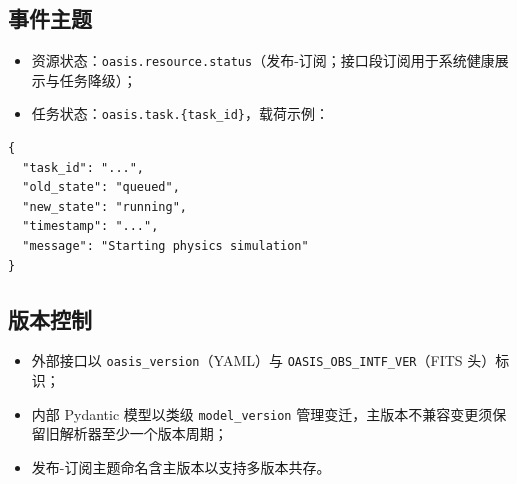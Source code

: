 \subsection{事件主题}

\begin{itemize}
  \item 资源状态：\texttt{oasis.resource.status}（发布-订阅；接口段订阅用于系统健康展示与任务降级）；
  \item 任务状态：\texttt{oasis.task.\{task\_id\}}，载荷示例：
\end{itemize}

\begin{verbatim}
{
  "task_id": "...",
  "old_state": "queued",
  "new_state": "running",
  "timestamp": "...",
  "message": "Starting physics simulation"
}
\end{verbatim}

\subsection{版本控制}

\begin{itemize}
  \item 外部接口以 \texttt{oasis\_version}（YAML）与 \texttt{OASIS\_OBS\_INTF\_VER}（FITS 头）标识；
  \item 内部 Pydantic 模型以类级 \texttt{model\_version} 管理变迁，主版本不兼容变更须保留旧解析器至少一个版本周期；
  \item 发布-订阅主题命名含主版本以支持多版本共存。
\end{itemize}
